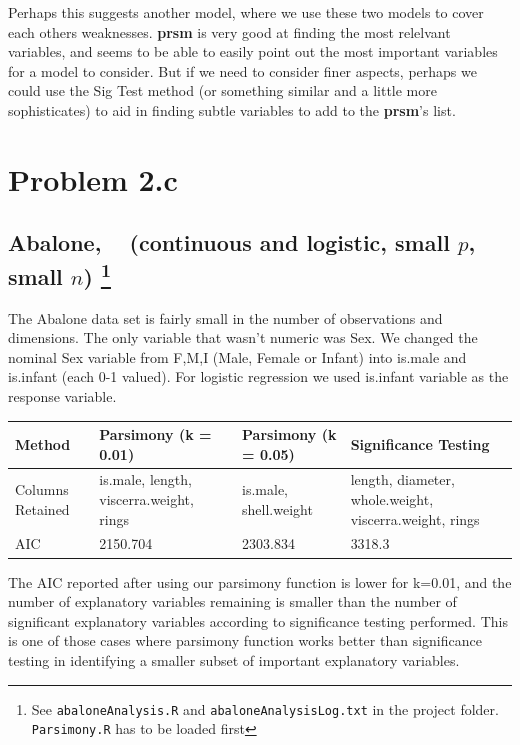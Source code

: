 \documentclass[letter]{article}
\newcounter{foot}
\begin{document}
Perhaps this suggests another model, where we use these two models to cover each others weaknesses. \textbf{prsm} is very good at finding the most relelvant variables, and seems to be able to easily point out the most important variables for a model to consider. But if we need to consider finer aspects, perhaps we could use the Sig Test method (or something similar and a little more sophisticates) to aid in finding subtle variables to add to the \textbf{prsm}'s list.



\section*{Problem 2.c}

\subsection*{Abalone, ~\cite{abalone} (continuous and logistic, small $p$, small $n$) \footnote{See \texttt{abaloneAnalysis.R} and \texttt{abaloneAnalysisLog.txt} in the project folder. \texttt{Parsimony.R} has to be loaded first}}

The Abalone data set is fairly small in the number of observations and dimensions. The only variable that wasn't numeric was Sex. We changed the nominal Sex variable from F,M,I (Male, Female or Infant) into is.male and is.infant (each 0-1 valued). For logistic regression we used is.infant variable as the response variable.

\begin{center}
    \begin{tabular}{ | l |  p{4cm} |  p{4cm} | p{4cm} |}
    \hline
    Method & Parsimony (k = 0.01) & Parsimony (k = 0.05) & Significance Testing \\ \hline
    	
    Columns Retained & is.male, length, viscerra.weight, rings & is.male, shell.weight & length, diameter, whole.weight, viscerra.weight, rings\\ \hline
    
    AIC & 2150.704 & 2303.834 & 3318.3\\ \hline
    
    \end{tabular}
\end{center}

The AIC reported after using our parsimony function is lower for k=0.01, and the number of explanatory variables remaining is smaller than the number of significant explanatory variables according to significance testing performed. This is one of those cases where parsimony function works better than significance testing in identifying a smaller subset of important explanatory variables.
\end{document}
